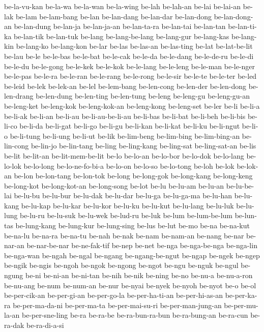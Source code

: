 {be-la-vu-kan be-la-wa be-la-wan be-la-wing be-lah be-lah-an be-lai
be-lai-an be-lak be-lam be-lam-bang be-lan be-lan-dang be-lan-dar
be-lan-dong be-lan-dong-an be-lan-dung be-lan-ja be-lan-ja-an be-lan-ta-ra
be-lan-tai be-lan-tan be-lan-ti-ka be-lan-tik be-lan-tuk be-lang
be-lang-be-lang be-lang-gur be-lang-kas be-lang-kin be-lang-ko be-lang-kon
be-lar be-las be-las-an be-las-ting be-lat be-lat-be-lit be-lau be-le
be-le-bas be-le-bat be-le-cak be-le-da be-le-dang be-le-de-ru be-le-di
be-le-du be-le-gong be-le-kek be-le-kok be-le-lang be-le-leng be-le-man
be-le-nger be-le-pas be-le-ra be-le-ran be-le-rang be-le-rong be-le-sir
be-le-te be-le-ter be-led be-leid be-lek be-lek-an be-lel be-lem-bang
be-len-cong be-len-der be-len-dong be-len-drang be-len-dung be-len-ting
be-len-tung be-leng be-leng-gu be-leng-gu-an be-leng-ket be-leng-kok
be-leng-kok-an be-leng-kong be-leng-set be-ler be-li be-li-a be-li-ak
be-li-an be-li-au be-li-au-be-li-au be-li-bas be-li-bat be-li-beh
be-li-bis be-li-co be-li-da be-li-gat be-li-go be-li-gu be-li-kan
be-li-kat be-li-ku be-li-ngut be-li-o be-li-tung be-li-ung be-li-ut be-lik
be-lim-beng be-lim-bing be-lim-bing-an be-lin-cong be-lin-jo be-lin-tang
be-ling be-ling-kang be-ling-sat be-ling-sat-an be-lis be-lit be-lit-an
be-lit-mem-be-lit be-lo be-lo-an be-lo-bor be-lo-dok be-lo-lang be-lo-lok
be-lo-long be-lo-ne-fo-bi-a be-lo-on be-lo-so be-lo-tong be-loh be-lok
be-lok-an be-lon be-lon-tang be-lon-tok be-long be-long-gok be-long-kang
be-long-keng be-long-kot be-long-kot-an be-long-song be-lot be-lu be-lu-am
be-lu-an be-lu-be-lai be-lu-bu be-lu-bur be-lu-dak be-lu-dar be-lu-ga
be-lu-ga-ma be-lu-han be-lu-kang be-lu-kap be-lu-kar be-lu-kor be-lu-ku
be-lu-kut be-lu-lang be-lu-luk be-lu-lung be-lu-ru be-lu-suk be-lu-wek
be-lud-ru be-luk be-lum be-lum-be-lum be-lun-tas be-lung-kang be-lung-kur
be-lung-sing be-lus be-lut be-mo be-na be-na-kut be-na-lu be-na-ra
be-na-tu be-nah be-nak be-nam be-nam-an be-nang be-nar be-nar-an
be-nar-be-nar be-ne-fak-tif be-nep be-net be-nga be-nga-be-nga be-nga-lin
be-nga-wan be-ngah be-ngal be-ngang be-ngang-be-ngut be-ngap be-ngek
be-ngep be-ngik be-ngis be-ngoh be-ngok be-ngong be-ngot be-ngu be-nguk
be-ngul be-ngung be-ni be-ni-an be-ni-tan be-nih be-nik be-ning be-no
be-nu-a be-nu-a-ron be-nu-ang be-num be-num-an be-nur be-nyai be-nyek
be-nyoh be-nyot be-o be-ol be-per-cik-an be-per-gi-an be-per-go-la
be-per-ha-ti-an be-per-hi-as-an be-per-ka-ra be-per-ma-da-ni be-per-ma-ta
be-per-mai-su-ri be-per-man-jung-an be-per-mu-la-an be-per-sne-ling be-ra
be-ra-be be-ra-bun-ra-bun be-ra-bung-an be-ra-cun be-ra-dak be-ra-di-a-si
}
